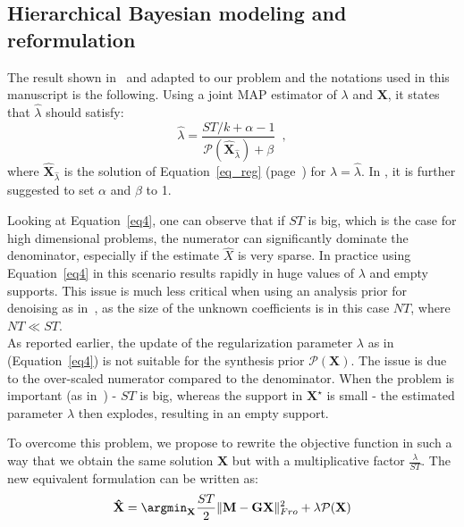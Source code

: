\subsection{Hierarchical Bayesian modeling and reformulation}


The result shown in~\cite{Figueiredo} and adapted to our problem and the notations used in this manuscript is the following. Using a joint MAP estimator of $\lambda$ and $\mathbf{X}$, it states that $\hat{\lambda}$ should satisfy:
\begin{equation} \label{eq4}
	\hat{\lambda} = \frac{ST/k + \alpha - 1}{\mathcal{P}(\mathbf{\hat{X}}_{\hat{\lambda}}) + \beta} \enspace ,
\end{equation}
where $\mathbf{\hat{X}}_{\hat{\lambda}}$ is the solution of Equation~\eqref{eq_reg} (page~\pageref{eq_reg}) for $\lambda = \hat{\lambda}$. In \cite{Figueiredo}, it is further suggested to set $\alpha$ and $\beta$ to 1.

Looking at Equation~\eqref{eq4}, one can observe that if $ST$ is big, which is the case for high dimensional problems, the numerator can significantly dominate the denominator, especially if the estimate $\hat{X}$ is very sparse.
In practice using Equation~\eqref{eq4} in this scenario results rapidly in huge values of $\lambda$ and empty supports. This issue is much less critical when using an analysis prior for denoising as in~\cite{Figueiredo}, as the size of the unknown coefficients is in this case $NT$, where $NT \ll ST$.\\

As reported earlier, the update of the regularization parameter $\lambda$ as in (Equation~\eqref{eq4}) is not suitable for the synthesis prior $\mathcal{P}(\mathbf{X})$. The issue is due to the over-scaled numerator compared to the denominator. When the problem is important (as in~\cite{Figueiredo}) - $ST$ is big, whereas the support in $\mathbf{X}^\star$ is small - the estimated parameter $\lambda$ then explodes, resulting in an empty support.

To overcome this problem, we propose to rewrite the objective function in such a way that we obtain the same solution $\mathbf{X}$ but with a multiplicative factor $\frac{\lambda}{ST}$. The new equivalent formulation can be written as:
\begin{equation} \label{eq5}
    \mathbf{\hat{X}} = \argmin_{\mathbf{X}} \frac{ST}{2}\|\mathbf{M - GX}\|^2_{Fro} + \lambda\mathcal{P}(\mathbf{X})
\end{equation}

